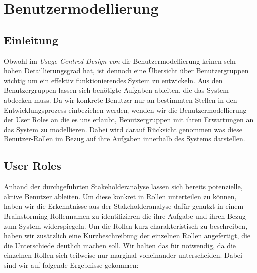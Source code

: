 \section{Benutzermodellierung}
\label{sec:Benutzermodellierung}

\subsection{Einleitung}
\label{sec:Benutzermodellierung_Einleitung}

Obwohl im \textit{Usage-Centred Design von \citet{softwareForUse}}
die Benutzermodellierung keinen sehr hohen Detaillierungsgrad hat, ist dennoch
eine Übersicht über Benutzergruppen wichtig um ein effektiv funktionierendes
System zu entwickeln. Aus den Benutzergruppen lassen sich benötigte Aufgaben
ableiten, die das System abdecken muss. Da wir konkrete Benutzer nur an
bestimmten Stellen in den Entwicklungsprozess einbeziehen werden, wenden wir
die Benutzermodellierung der User Roles \textit{\citep[Kapitel~4]{softwareForUse}} an die es uns erlaubt,
Benutzergruppen mit ihren Erwartungen an das System zu modellieren. Dabei wird
darauf Rücksicht genommen was diese Benutzer-Rollen im Bezug auf ihre
Aufgaben innerhalb des Systems darstellen.

\subsection{User Roles}
\label{sec:User_Roles}

Anhand der durchgeführten Stakeholderanalyse lassen sich bereits potenzielle,
aktive Benutzer ableiten. Um diese konkret in Rollen unterteilen zu können,
haben wir die Erkenntnisse aus der Stakeholderanalyse dafür genutzt in einem
Brainstorming Rollennamen zu identifizieren die ihre Aufgabe und ihren Bezug
zum System widerspiegeln.
Um die Rollen kurz charakteristisch zu beschreiben, haben wir zusätzlich eine
Kurzbeschreibung der einzelnen Rollen angefertigt, die die Unterschiede
deutlich machen soll. Wir halten das für notwendig, da die einzelnen Rollen
sich teilweise nur marginal voneinander unterscheiden.
Dabei sind wir auf folgende Ergebnisse gekommen:

